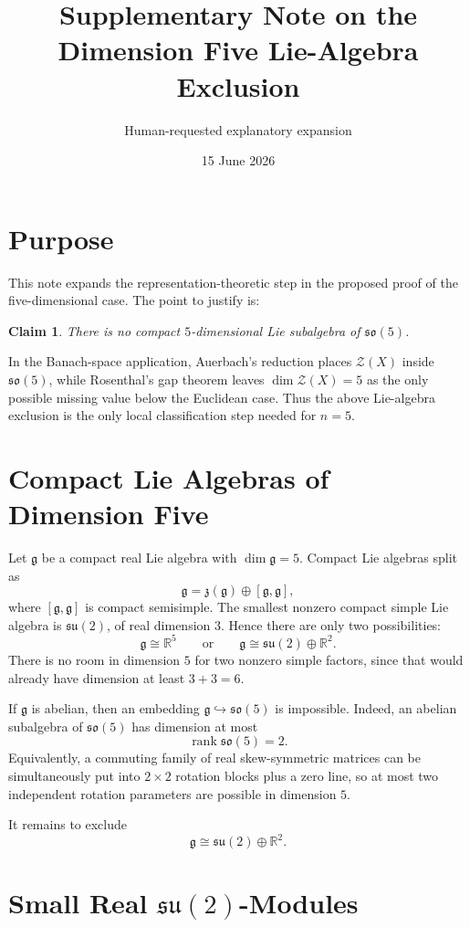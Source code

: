\documentclass[11pt]{article}
\title{Supplementary Note on the Dimension Five Lie-Algebra Exclusion}
\author{Human-requested explanatory expansion}
\date{15 June 2026}
\newtheorem*{claim}{Claim}
\newcommand{\R}{\mathbb R}
\newcommand{\fg}{\mathfrak g}
\newcommand{\fz}{\mathfrak z}
\newcommand{\so}{\mathfrak{so}}
\newcommand{\su}{\mathfrak{su}}
\begin{document}
\maketitle

\section*{Purpose}

This note expands the representation-theoretic step in the proposed proof of
the five-dimensional case.  The point to justify is:

\begin{claim}
There is no compact \(5\)-dimensional Lie subalgebra of \(\so(5)\).
\end{claim}

In the Banach-space application, Auerbach's reduction places
\(\mathcal Z(X)\) inside \(\so(5)\), while Rosenthal's gap theorem leaves
\(\dim\mathcal Z(X)=5\) as the only possible missing value below the
Euclidean case.  Thus the above Lie-algebra exclusion is the only local
classification step needed for \(n=5\).

\section*{Compact Lie Algebras of Dimension Five}

Let \(\fg\) be a compact real Lie algebra with \(\dim\fg=5\).  Compact Lie
algebras split as
\[
  \fg=\fz(\fg)\oplus[\fg,\fg],
\]
where \([\fg,\fg]\) is compact semisimple.  The smallest nonzero compact
simple Lie algebra is \(\su(2)\), of real dimension \(3\).  Hence there are
only two possibilities:
\[
  \fg\cong \R^5
  \qquad\text{or}\qquad
  \fg\cong \su(2)\oplus\R^2.
\]
There is no room in dimension \(5\) for two nonzero simple factors, since
that would already have dimension at least \(3+3=6\).

If \(\fg\) is abelian, then an embedding \(\fg\hookrightarrow\so(5)\) is
impossible.  Indeed, an abelian subalgebra of \(\so(5)\) has dimension at
most
\[
  \operatorname{rank}\so(5)=2.
\]
Equivalently, a commuting family of real skew-symmetric matrices can be
simultaneously put into \(2\times2\) rotation blocks plus a zero line, so at
most two independent rotation parameters are possible in dimension \(5\).

It remains to exclude
\[
  \fg\cong \su(2)\oplus\R^2.
\]

\section*{Small Real \(\su(2)\)-Modules}
\end{document}
